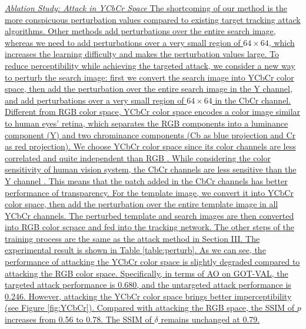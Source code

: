 \documentclass[12pt]{article}
\begin{document}
\uline{\textit{Ablation Study: Attack in YCbCr Space}
The shortcoming of our method is the more conspicuous perturbation values compared to existing target tracking attack algorithms. Other methods add perturbations over the entire search image, whereas we need to add perturbations over a very small region of $64 \times 64$, which increases the learning difficulty and makes the perturbation values large. To reduce perceptibility while achieving the targeted attack, we consider a new way to perturb the search image: first we convert the search image into YCbCr color space, then add the perturbation over the entire search image in the Y channel, and add perturbations over a very small region of $64 \times 64$ in the CbCr channel. Different from RGB color space, YCbCr color space encodes a color image similar to human eyes’ retina, which separates the RGB components into a luminance component (Y) and two chrominance components (Cb as blue projection and Cr as red projection). We choose YCbCr color space since its color channels are less correlated and quite independent than RGB \cite{8630918}. While considering the color sensitivity of human vision system, the CbCr channels are less sensitive than the Y channel \cite{8630918}. This means that the patch added in the CbCr channels has better performance of transparency.
For the template image, we convert it into YCbCr color space, then add the perturbation over the entire template image in all YCbCr channels. The perturbed template and search images are then converted into RGB color scpace and fed into the tracking network. The other steps of the training process are the same as the attack method in Section III. The experimental result is shown in Table \ref{table:perturb}. As we can see, the performance of attacking the YCbCr color space is slightly degraded compared to attacking the RGB color space. Specifically, in terms of AO on GOT-VAL, the targeted attack performance is 0.680, and the untargeted attack performance is 0.246. However, attacking the YCbCr color space brings better imperceptibility (see Figure \ref{fig:YCbCr}). Compared with attacking the RGB space, the SSIM of $p$ increases from 0.56 to 0.78. The SSIM of $\delta$ remains unchanged at 0.79.
}

\end{document}
